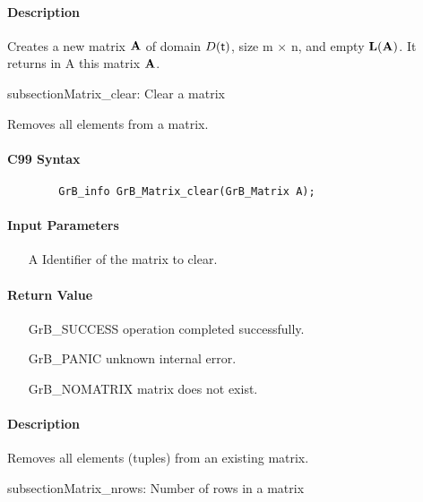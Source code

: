 \paragraph{Description}

Creates a new matrix ${\bf A}$ of domain $D({\sf t})$, size {\sf m $\times$ n}, and
empty $\bold{L}({\bf A})$. It returns in {\sf A} this matrix ${\bf A}$.

subsection{{\sf Matrix\_clear}: Clear a matrix}

Removes all elements from a matrix.

\paragraph{C99 Syntax}

\begin{verbatim}
        GrB_info GrB_Matrix_clear(GrB_Matrix A);
\end{verbatim}

\paragraph{Input Parameters}

\begin{itemize}[leftmargin=1.1in]
    \item[{\sf A}] Identifier of the matrix to clear.
\end{itemize}

\paragraph{Return Value}

\begin{itemize}[leftmargin=2.1in]
\item[{\sf GrB\_SUCCESS}]   operation completed successfully.
\item[{\sf GrB\_PANIC}]     unknown internal error.
\item[{\sf GrB\_NOMATRIX}]  matrix does not exist.
\end{itemize}

\paragraph{Description}

Removes all elements (tuples) from an existing matrix.

subsection{{\sf Matrix\_nrows}: Number of rows in a matrix}

